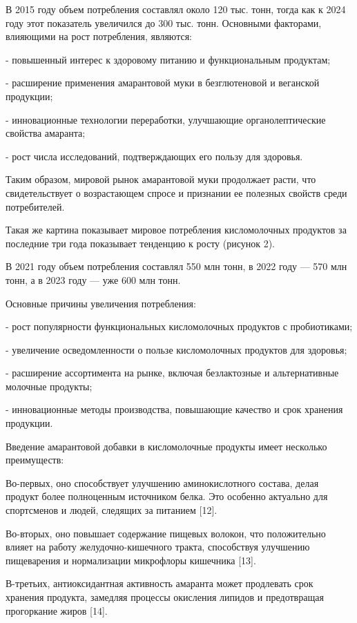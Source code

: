 \begin{multicols}{2}
В 2015 году объем потребления составлял около 120 тыс. тонн, тогда как к
2024 году этот показатель увеличился до 300 тыс. тонн. Основными
факторами, влияющими на рост потребления, являются:

- повышенный интерес к здоровому питанию и функциональным продуктам;

- расширение применения амарантовой муки в безглютеновой и веганской
продукции;

- инновационные технологии переработки, улучшающие органолептические
свойства амаранта;

- рост числа исследований, подтверждающих его пользу для здоровья.

Таким образом, мировой рынок амарантовой муки продолжает расти, что
свидетельствует о возрастающем спросе и признании ее полезных свойств
среди потребителей.

Такая же картина показывает мировое потребления кисломолочных продуктов
за последние три года показывает тенденцию к росту (рисунок 2).

В 2021 году объем потребления составлял 550 млн тонн, в 2022 году ---
570 млн тонн, а в 2023 году --- уже 600 млн тонн.

Основные причины увеличения потребления:

- рост популярности функциональных кисломолочных продуктов с
пробиотиками;

- увеличение осведомленности о пользе кисломолочных продуктов для
здоровья;

- расширение ассортимента на рынке, включая безлактозные и
альтернативные молочные продукты;

- инновационные методы производства, повышающие качество и срок хранения
продукции.

Введение амарантовой добавки в кисломолочные продукты имеет несколько
преимуществ:

Во-первых, оно способствует улучшению аминокислотного состава, делая
продукт более полноценным источником белка. Это особенно актуально для
спортсменов и людей, следящих за питанием {[}12{]}.

Во-вторых, оно повышает содержание пищевых волокон, что положительно
влияет на работу желудочно-кишечного тракта, способствуя улучшению
пищеварения и нормализации микрофлоры кишечника {[}13{]}.

В-третьих, антиоксидантная активность амаранта может продлевать срок
хранения продукта, замедляя процессы окисления липидов и предотвращая
прогоркание жиров {[}14{]}.


\end{multicols}
